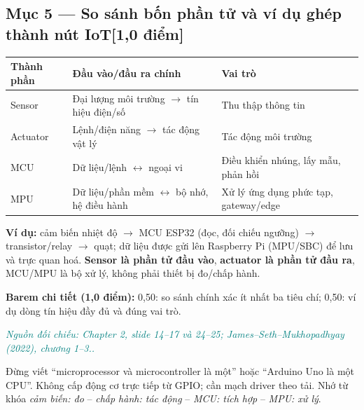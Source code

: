 \documentclass[11pt,a4paper]{article}
\newcommand{\pointpart}[2]{\subsection*{Mục #1 --- #2\hfill\normalsize\color{teal}[1,0 điểm]}}
\newcommand{\src}[1]{\par\noindent\textcolor{teal}{\footnotesize\textit{Nguồn đối chiếu: #1.}}\par}
\newcommand{\scoring}[1]{\par\noindent\textbf{Barem chi tiết (1,0 điểm):} #1\par}
\newcommand{\kw}[1]{\textbf{#1}}
\begin{document}
\pointpart{5}{So sánh bốn phần tử và ví dụ ghép thành nút IoT}
\begin{center}\small
\begin{tabularx}{\linewidth}{@{}p{24mm}X X@{}}\toprule
\textbf{Thành phần} & \textbf{Đầu vào/đầu ra chính} & \textbf{Vai trò}\\\midrule
Sensor & Đại lượng môi trường $\to$ tín hiệu điện/số & Thu thập thông tin\\
Actuator & Lệnh/điện năng $\to$ tác động vật lý & Tác động môi trường\\
MCU & Dữ liệu/lệnh $\leftrightarrow$ ngoại vi & Điều khiển nhúng, lấy mẫu, phản hồi\\
MPU & Dữ liệu/phần mềm $\leftrightarrow$ bộ nhớ, hệ điều hành & Xử lý ứng dụng phức tạp, gateway/edge\\\bottomrule
\end{tabularx}\end{center}
\kw{Ví dụ:} cảm biến nhiệt độ $\rightarrow$ MCU ESP32 (đọc, đối chiếu ngưỡng) $\rightarrow$ transistor/relay $\rightarrow$ quạt; dữ liệu được gửi lên Raspberry Pi (MPU/SBC) để lưu và trực quan hoá. \kw{Sensor là phần tử đầu vào}, \kw{actuator là phần tử đầu ra}, MCU/MPU là bộ xử lý, không phải thiết bị đo/chấp hành.
\scoring{0,50: so sánh chính xác ít nhất ba tiêu chí; 0,50: ví dụ dòng tín hiệu đầy đủ và đúng vai trò.}
\src{Chapter 2, slide 14--17 và 24--25; James--Seth--Mukhopadhyay (2022), chương 1--3.}
\begin{warningbox}Đừng viết ``microprocessor và microcontroller là một'' hoặc ``Arduino Uno là một CPU''. Không cấp động cơ trực tiếp từ GPIO; cần mạch driver theo tải. Nhớ từ khóa \emph{cảm biến: đo} -- \emph{chấp hành: tác động} -- \emph{MCU: tích hợp} -- \emph{MPU: xử lý}.\end{warningbox}

\clearpage
\end{document}
